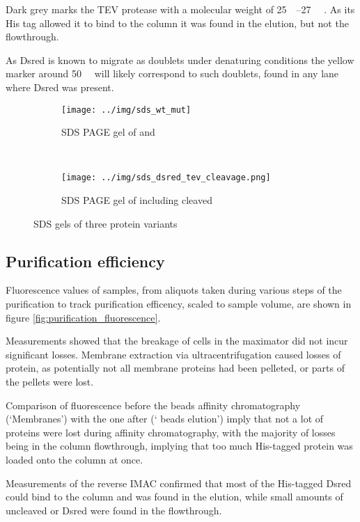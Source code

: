 Dark grey marks the TEV protease with a molecular weight of
\SIrange{25}{27}{\kilo\Da} \cite{pdb}. As its His tag allowed it to bind to the
column it was found in the elution, but not the flowthrough.

As Dsred is known to migrate as doublets under denaturing
conditions\cite{sacchetti2002} the yellow marker around \SI{50}{\kilo\Da} will
likely correspond to such doublets, found in any lane where Dsred was present.

\begin{figure*}
    \centering
    \begin{subfigure}{0.45\textwidth}
        \texttt{[image: ../img/sds\_wt\_mut]}
	\caption{SDS PAGE gel of \hs{} and \hsmut{}}
        \label{fig:sds_wt_mut}
    \end{subfigure}
    ~
    \begin{subfigure}{0.45\textwidth}
        \texttt{[image: ../img/sds\_dsred\_tev\_cleavage.png]}
	\caption{SDS PAGE gel of \hsdsred{} including cleaved \hsdsred{}}
        \label{fig:sds_dsred_cleaved}
    \end{subfigure}
    \caption{SDS gels of three protein variants}
    \label{fig:sds}
\end{figure*}

\subsection{Purification efficiency}

Fluorescence values of \hsdsred{} samples, from aliquots taken during various
steps of the purification to track purification efficency, scaled to sample
volume, are shown in figure \ref{fig:purification_fluorescence}.


Measurements showed that the breakage of cells in the maximator did not incur
significant losses. Membrane extraction via ultracentrifugation caused losses
of protein, as potentially not all membrane proteins had been pelleted, or
parts of the pellets were lost.

Comparison of fluorescence before the  beads affinity chromatography
(`Membranes') with the one after (` beads elution') imply that not a lot
of proteins were lost during affinity chromatography, with the majority of
losses being in the column flowthrough, implying that too much His-tagged
protein was loaded onto the column at once.

Measurements of the reverse IMAC confirmed that most of the His-tagged Dsred
could bind to the column and was found in the elution, while small amounts of
uncleaved \hsdsred{} or Dsred were found in the flowthrough.

